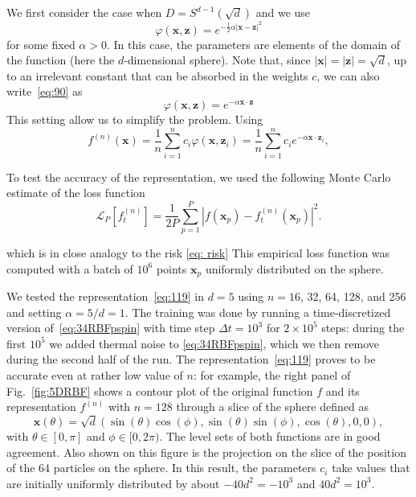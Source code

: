 \documentclass{article}
\begin{document}
We first consider the case when $D = S^{d-1}(\sqrt{d})$ and we use
%
\begin{equation}
  \label{eq:90}
  \varphi(\mathbf{x},\mathbf{z}) = e^{-\tfrac12 \alpha |\mathbf{x}-\mathbf{z}|^2}
\end{equation}
%
for some fixed $\alpha >0$. In this case, the parameters
are elements of the domain of the function (here the $d$-dimensional
sphere). 
Note that, since $|\mathbf{x}|=|\mathbf{z}| = \sqrt{d}$, up to an
irrelevant constant that can be absorbed in the weights $c$, we can
also write~\eqref{eq:90} as
%
\begin{equation}
  \label{eq:90red}
  \varphi(\mathbf{x},\mathbf{z}) = e^{-\alpha \mathbf{x}\cdot \mathbf{z}}
\end{equation}
%
This setting allow us to simplify the problem. Using
%
\begin{equation}
  \label{eq:119}
  f^{(n)}(\mathbf{x}) = \frac1n \sum_{i=1}^n c_i \varphi(\mathbf{x},\mathbf{z}_i)
  = \frac1n \sum_{i=1}^n c_i e^{-\alpha \mathbf{x}\cdot \mathbf{z}_i},
\end{equation}

 To test the accuracy of the
representation, we used the following Monte Carlo estimate of the loss
function
%
 \begin{equation}
   \label{eq:lossempirical}
   \mathcal{L}_P[f^{(n)}_t] = \frac{1}{2P} \sum_{p=1}^P \left|f(\mathbf{x}_p) - f^{(n)}_t(\mathbf{x}_p)\right|^2.
 \end{equation}

 which is in close analogy to the risk \ref{eq: risk}
 This empirical loss function was computed with a batch of $10^6$
 points $\mathbf{x}_p$ uniformly distributed on the sphere.

We tested the representation~\eqref{eq:119} in $d=5$ using $n=16$, 32,
64, 128, and 256 and setting $\alpha = 5/d= 1$. The training was done
by running a time-discretized version of~\eqref{eq:34RBFpspin} with
time step $\Delta t = 10^{3}$ for $2 \times 10^5$ steps: during the
first $10^5$ we added thermal noise to
\eqref{eq:34RBFpspin}, which we then remove during the second half of
the run. The representation~\eqref{eq:119} proves to be accurate even
at rather low value of $n$: for example, the right panel of
Fig.~\ref{fig:5DRBF} shows a contour plot of the original function $f$
and its representation $f^{(n)}$ with $n=128$ through a slice of the
sphere defined as
%
\begin{equation}
  \label{eq:slice}
  \mathbf{x}(\theta) = \sqrt{d} \left(\sin(\theta)\cos(\phi),
    \sin(\theta)\sin(\phi),
    \cos(\theta), 0,0\right), 
\end{equation}
%
with $\theta\in[0,\pi]$ and $\phi\in [0,2\pi)$.
The level sets of both functions are in good agreement. Also shown on
this figure is the projection on the slice of the position of the 64
particles on the sphere. In this result, the parameters $c_i$ take
values that are initially uniformly distributed by about
$-40 d^2 = -10^3$ and $40 d^2 = 10^3$.
\end{document}
